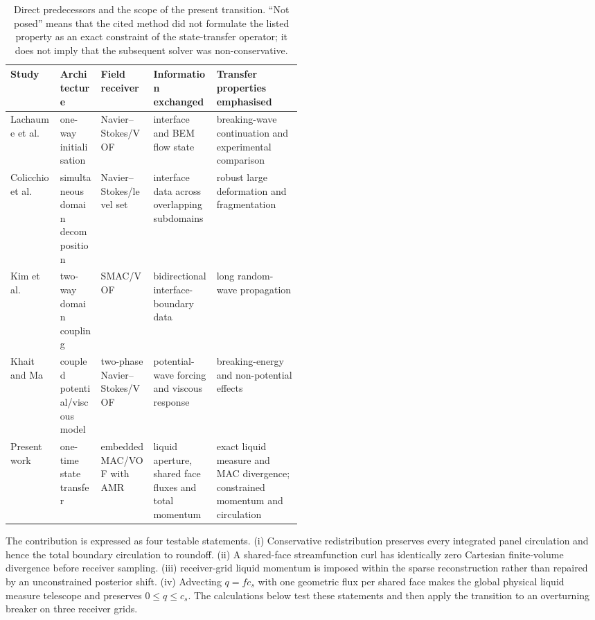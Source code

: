 \documentclass[11pt]{article}
\begin{document}
\begin{table}[t]
\centering
\scriptsize
\caption{Direct predecessors and the scope of the present transition.  ``Not
posed'' means that the cited method did not formulate the listed property as
an exact constraint of the state-transfer operator; it does not imply that the
subsequent solver was non-conservative.}
\label{tab:prior-hybrids}
\begin{tabularx}{\linewidth}{@{}P{0.17\linewidth}P{0.14\linewidth}P{0.18\linewidth}Y Y@{}}
\toprule
Study & Architecture & Field receiver & Information exchanged & Transfer properties emphasised \\
\midrule
Lachaume et al.\ \cite{LachaumeEtAl2003} & one-way initialisation & Navier--Stokes/VOF & interface and BEM flow state & breaking-wave continuation and experimental comparison \\
Colicchio et al.\ \cite{ColicchioGrecoFaltinsen2006} & simultaneous domain decomposition & Navier--Stokes/level set & interface data across overlapping subdomains & robust large deformation and fragmentation \\
Kim et al.\ \cite{KimYamashiroYoshida2010} & two-way domain coupling & SMAC/VOF & bidirectional interface-boundary data & long random-wave propagation \\
Khait and Ma \cite{KhaitMa2021} & coupled potential/viscous model & two-phase Navier--Stokes/VOF & potential-wave forcing and viscous response & breaking-energy and non-potential effects \\
Present work & one-time state transfer & embedded MAC/VOF with AMR & liquid aperture, shared face fluxes and total momentum & exact liquid measure and MAC divergence; constrained momentum and circulation \\
\bottomrule
\end{tabularx}
\end{table}

The contribution is expressed as four testable statements.  (i) Conservative
redistribution preserves every integrated panel circulation and hence the
total boundary circulation to roundoff.  (ii) A shared-face streamfunction
curl has identically zero Cartesian finite-volume divergence before receiver
sampling.  (iii) receiver-grid liquid momentum is imposed within the sparse
reconstruction rather than repaired by an unconstrained posterior shift.
(iv) Advecting $q=f c_s$ with one geometric flux per shared face makes the
global physical liquid measure telescope and preserves $0\le q\le c_s$.
The calculations below test these statements and then apply the
transition to an overturning breaker on three receiver grids.
\end{document}
